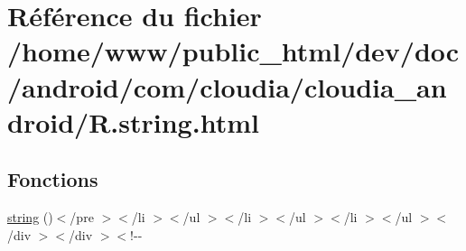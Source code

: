 \hypertarget{_r_8string_8html}{\section{Référence du fichier /home/www/public\-\_\-html/dev/doc/android/com/cloudia/cloudia\-\_\-android/\-R.string.\-html}
\label{_r_8string_8html}
}
\subsection*{Fonctions}
\begin{DoxyCompactItemize}
\item 
\hyperlink{_r_8string_8html_a9b4f34f7f72bdf34616daf0a09131ad5}{string} ()$<$/pre $>$$<$/li $>$$<$/ul $>$$<$/li $>$$<$/ul $>$$<$/li $>$$<$/ul $>$$<$/div $>$$<$/div $>$$<$!-\/-\/
\end{DoxyCompactItemize}
